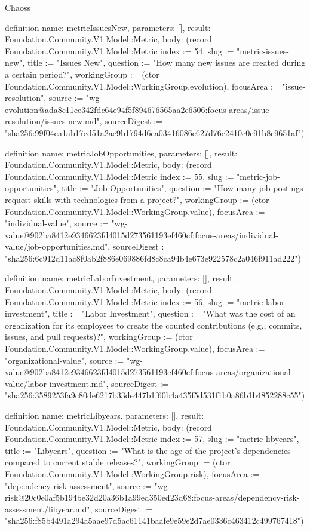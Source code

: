 \begin{lexlean}{Chaoss}
\begin{semanticmodule}
definition{
  name: metricIssuesNew,
  parameters: [],
  result: Foundation.Community.V1.Model::Metric,
  body: (record Foundation.Community.V1.Model::Metric {index := 54, slug := "metric-issues-new", title := "Issues New", question := "How many new issues are created during a certain period?", workingGroup := (ctor Foundation.Community.V1.Model::WorkingGroup.evolution), focusArea := "issue-resolution", source := "wg-evolution@ada8c11ee342fdc64e94f5f894676565aa2e6506:focus-areas/issue-resolution/issues-new.md", sourceDigest := "sha256:99f04ea1ab17ed51a2ae9b1794d6ea03416086c627d76e2410c0c91b8e9651af"})
}

definition{
  name: metricJobOpportunities,
  parameters: [],
  result: Foundation.Community.V1.Model::Metric,
  body: (record Foundation.Community.V1.Model::Metric {index := 55, slug := "metric-job-opportunities", title := "Job Opportunities", question := "How many job postings request skills with technologies from a project?", workingGroup := (ctor Foundation.Community.V1.Model::WorkingGroup.value), focusArea := "individual-value", source := "wg-value@902ba8412e9346623fd4015d273561193ef460cf:focus-areas/individual-value/job-opportunities.md", sourceDigest := "sha256:6c912d11ac8f0ab2f886e069886fd8c8ca94b4e673e922578c2a046f911ad222"})
}

definition{
  name: metricLaborInvestment,
  parameters: [],
  result: Foundation.Community.V1.Model::Metric,
  body: (record Foundation.Community.V1.Model::Metric {index := 56, slug := "metric-labor-investment", title := "Labor Investment", question := "What was the cost of an organization for its employees to create the counted contributions (e.g., commits, issues, and pull requests)?", workingGroup := (ctor Foundation.Community.V1.Model::WorkingGroup.value), focusArea := "organizational-value", source := "wg-value@902ba8412e9346623fd4015d273561193ef460cf:focus-areas/organizational-value/labor-investment.md", sourceDigest := "sha256:3589253fa9c80de6217b33de447b1f60b4a435f5d531f1b0a86b1b4852288c55"})
}

definition{
  name: metricLibyears,
  parameters: [],
  result: Foundation.Community.V1.Model::Metric,
  body: (record Foundation.Community.V1.Model::Metric {index := 57, slug := "metric-libyears", title := "Libyears", question := "What is the age of the project’s dependencies compared to current stable releases?", workingGroup := (ctor Foundation.Community.V1.Model::WorkingGroup.risk), focusArea := "dependency-risk-assessment", source := "wg-risk@20c0e0af5b194be32d20a36b1a99ed350ed23d68:focus-areas/dependency-risk-assessment/libyear.md", sourceDigest := "sha256:f85b4491a294a5aae97d5ac61141baafe9e59e2d7ae0336c463412c499767418"})
}


\end{semanticmodule}
\end{lexlean}
